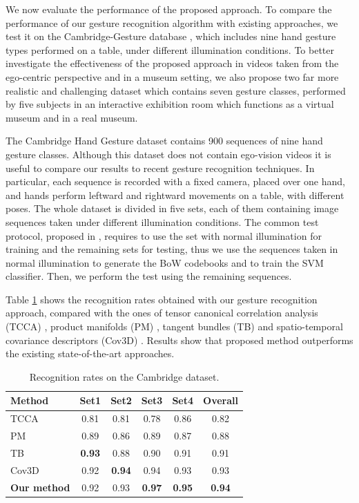 We now evaluate the performance of the proposed approach. To compare the performance of our gesture recognition algorithm with existing approaches, we test it on the Cambridge-Gesture database \cite{kim2007tensor}, which includes nine hand gesture types performed on a table, under different illumination conditions. To better investigate the effectiveness of the proposed approach in videos taken from the ego-centric perspective and in a museum setting, we also propose two far more realistic and challenging dataset which contains seven gesture classes, performed by five subjects in an interactive exhibition room which functions as a virtual museum and in a real museum. 

The Cambridge Hand Gesture dataset contains 900 sequences of nine hand gesture classes. Although this dataset does not contain ego-vision videos it is useful to compare our results to recent gesture recognition techniques. In particular, each sequence is recorded with a fixed camera, placed over one hand, and hands perform leftward and rightward movements on a table, with different poses. The whole dataset is divided in five sets, each of them containing image sequences taken under different illumination conditions. The common test protocol, proposed in \cite{kim2007tensor}, requires to use the set with normal illumination for training and the remaining sets for testing, thus we use the sequences taken in normal illumination to generate the BoW codebooks and to train the SVM classifier. Then, we perform the test using the remaining sequences.   

Table \ref{cambridge} shows the recognition rates obtained with our gesture recognition approach, compared with the ones of tensor canonical correlation analysis (TCCA) \cite{kim2009canonical}, product manifolds (PM) \cite{lui2010action}, tangent bundles (TB) \cite{lui2011tangent} and spatio-temporal covariance descriptors (Cov3D) \cite{sanin2013spatio}. Results show that proposed method outperforms the existing state-of-the-art approaches.


\begin{table}
\begin{center}
\begin{tabular}{|l|c|c|c|c|c|}
\hline
\textbf{Method}					& \textbf{Set1}		& \textbf{Set2}		& \textbf{Set3}		& \textbf{Set4}	 	& \textbf{Overal}l \\
\hline
\hline
TCCA \cite{kim2009canonical}		& 0.81		& 0.81		& 0.78		& 0.86		& 0.82 \\
\hline
PM \cite{lui2010action}			& 0.89		& 0.86		& 0.89		& 0.87		& 0.88  \\
\hline
TB \cite{lui2011tangent}			& \textbf{0.93}	& 0.88		& 0.90		& 0.91		& 0.91 \\
\hline
Cov3D \cite{sanin2013spatio}		& 0.92		&\textbf{0.94}	& 0.94		& 0.93		& 0.93 \\
\hline
\textbf{Our method}			& 0.92		& 0.93		& \textbf{0.97}	& \textbf{0.95}	& \textbf{0.94} \\
\hline
\end{tabular}
\end{center}
\caption{Recognition rates on the Cambridge dataset.}
\label{cambridge}
\end{table}



